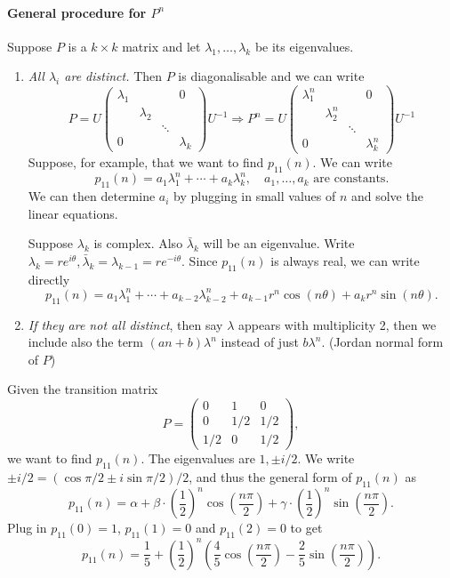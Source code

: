 \documentclass[a4paper]{article}
\begin{document}
\paragraph*{General procedure for $ P^n $} Suppose $P$ is a $k\times k$ matrix and let $ \lambda_1,\dots,\lambda_k $ be its eigenvalues.
\begin{enumerate}[(1)]
    \item \textit{All $ \lambda_i $ are distinct.} Then $P$ is diagonalisable and we can write 
    \[
        P = U \begin{pmatrix}
            \lambda_1&&&0\\ 
            &\lambda_2&&\\ 
            &&\ddots&\\ 
            0&&&\lambda_k
        \end{pmatrix}U^{-1} \Longrightarrow P^n=U \begin{pmatrix}
            \lambda^n_1&&&0\\ 
            &\lambda^n_2&&\\ 
            &&\ddots&\\ 
            0&&&\lambda^n_k
        \end{pmatrix}U^{-1}
    \]
    Suppose, for example, that we want to find $p_{11}(n)$. We can write 
    \[
        p_{11}(n)=a_1 \lambda_1^n+\cdots + a_k \lambda_k^n,\quad a_1,\dots,a_k \text{ are constants}.
    \]
    We can then determine $a_i$ by plugging in small values of $n$ and solve the linear equations.

    Suppose $\lambda_k$ is complex. Also $ \bar{\lambda}_k $ will be an eigenvalue. Write $ \lambda_k=re^{i\theta}, \bar{\lambda}_k=\lambda_{k-1}=re^{-i\theta} $. Since $p_{11}(n)$ is always real, we can write directly
    \[
        p_{11}(n)=a_1 \lambda_1^n+\cdots + a_{k-2}\lambda_{k-2}^n+a_{k-1}r^{n}\cos (n\theta)+a_kr^n \sin (n\theta).
    \]
    \item \textit{If they are not all distinct}, then say $ \lambda $ appears with multiplicity 2, then we include also the term $ (an+b)\lambda^n $ instead of just $ b\lambda^n $. (Jordan normal form of $P$)
\end{enumerate}

\begin{example}
	Given the transition matrix
	$$
	P = \begin{pmatrix}
		0 & 1 & 0 \\
		0 & 1/2 & 1/2 \\ 
		1/2 & 0 & 1/2
	\end{pmatrix},
	$$
	we want to find $p_{11}(n)$. The eigenvalues are $1, \pm i/2$. We write $\pm i/2 = (\cos \pi/2 \pm i \sin \pi/2)/2$, and thus the general form of $p_{11}(n)$ as
	$$
	p_{11}(n) = \alpha + \beta \cdot \left(\frac{1}{2}\right)^n \cos \left(\frac{n \pi}{2}\right) + \gamma \cdot \left(\frac{1}{2}\right)^n \sin\left(\frac{n \pi}{2}\right).
	$$
	Plug in $p_{11}(0) = 1$, $p_{11}(1) = 0$ and $p_{11}(2) = 0$ to get
	$$
	p_{11}(n) = \frac{1}{5} + \left(\frac{1}{2}\right)^n \left(\frac{4}{5}\cos\left(\frac{n \pi}{2}\right) - \frac{2}{5} \sin \left(\frac{n \pi}{2}\right)\right).
	$$
\end{example}
\end{document}
